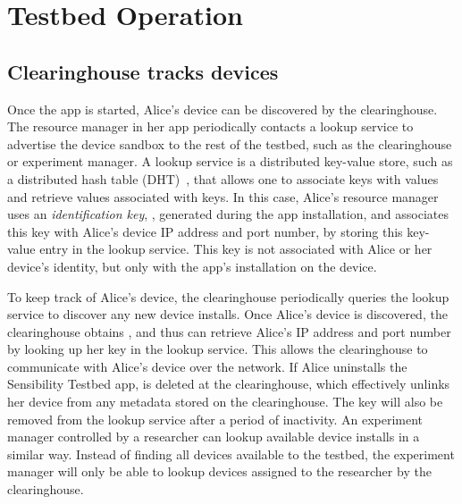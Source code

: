\section{Testbed Operation}

\subsection{Clearinghouse tracks devices}\label{sec-case1}
Once the app is started, Alice's device can be discovered by 
the clearinghouse. The resource manager in her app periodically contacts 
a lookup service to advertise the device sandbox to the rest of the testbed, 
such as the clearinghouse or experiment manager. 
A lookup service is a distributed key-value store, such as a 
distributed hash table (DHT)~\cite{dht}, that allows one to associate 
keys with values and retrieve values associated with keys. In this case, 
Alice's resource manager uses an \textit{identification key}, , 
generated during the app installation, and associates this key 
with Alice's device IP address and port number, by 
storing this key-value entry in the lookup service. This key is not 
associated with Alice or her device's identity, but only with the app's 
installation on the device. 


To keep track of Alice's device, the
clearinghouse periodically queries the lookup service to
discover any new device installs. Once Alice's device is discovered, the
clearinghouse obtains , and thus
can retrieve Alice's  IP address and port number by 
looking up her key in the lookup service. This allows the clearinghouse
to communicate with Alice's device over the network.
If Alice uninstalls the Sensibility Testbed app, 
 is deleted at the clearinghouse, which effectively unlinks
her device from any metadata stored on the clearinghouse. The key
will also be removed from the lookup service after a period of inactivity.
An experiment manager controlled by a researcher can lookup
available device installs in a similar way. Instead of finding all devices
available to the testbed, the experiment manager will only be able to 
lookup devices assigned to the researcher by the clearinghouse.

